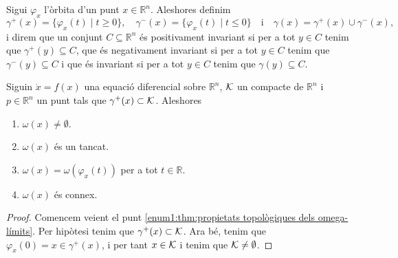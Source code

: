 \documentclass[../../main.tex]{subfiles}
\begin{document}
    \begin{definition}
        \label{def:conjunt positivament invariant}
        \label{def:conjunt negativament invariant}
        \label{def:conjunt invariant}
        Sigui \(\varphi_{x}\) l'òrbita d'un punt \(x\in\mathbb{R}^{n}\).
        Aleshores definim
        \[
            \gamma^{+}(x)=\{\varphi_{x}(t)\mid t\geq0\},\quad\gamma^{-}(x)=\{\varphi_{x}(t)\mid t\leq0\}\quad\text{i}\quad\gamma(x)=\gamma^{+}(x)\cup\gamma^{-}(x),
        \]
        i direm que un conjunt \(C\subseteq\mathbb{R}^{n}\) és positivament invariant si per a tot \(y\in C\) tenim que \(\gamma^{+}(y)\subseteq C\), que és negativament invariant si per a tot \(y\in C\) tenim que \(\gamma^{-}(y)\subseteq C\) i que és invariant si per a tot \(y\in C\) tenim que \(\gamma(y)\subseteq C\).
    \end{definition}
    \begin{theorem}
        \label{thm:propietats topològiques dels omega-límits}
        Siguin
        \(\dot{x}=f(x)\)
        una equació diferencial sobre \(\mathbb{R}^{n}\), \(\mathcal{K}\) un compacte de \(\mathbb{R}^{n}\) i \(p\in\mathbb{R}^{n}\) un punt tals que \(\gamma^{+}(x)\subset\mathcal{K}\).
        Aleshores
        \begin{enumerate}
            \item\label{enum1:thm:propietats topològiques dels omega-límits} \(\omega(x)\neq\emptyset\).
            \item\label{enum2:thm:propietats topològiques dels omega-límits} \(\omega(x)\) és un tancat.
            \item\label{enum3:thm:propietats topològiques dels omega-límits} \(\omega(x)=\omega(\varphi_{x}(t))\) per a tot \(t\in\mathbb{R}\).
            \item\label{enum4:thm:propietats topològiques dels omega-límits} \(\omega(x)\) és connex.
        \end{enumerate}
    \end{theorem}
    \begin{proof}
        Comencem veient el punt \eqref{enum1:thm:propietats topològiques dels omega-límits}.
        Per hipòtesi tenim que \(\gamma^{+}(x)\subset\mathcal{K}\).
        Ara bé, tenim que \(\varphi_{x}(0)=x\in\gamma^{+}(x)\), i per tant \(x\in\mathcal{K}\) i tenim que \(\mathcal{K}\neq\emptyset\).
    \end{proof}
\end{document}
